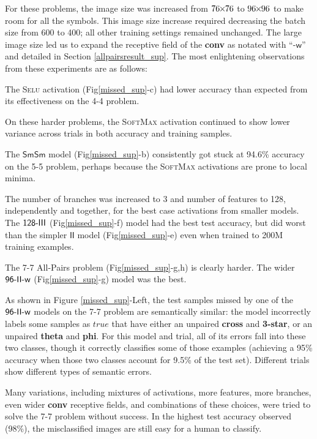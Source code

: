 For these problems, the image size was increased
from $76{\mkern-1.5mu\times\mkern-1.5mu}76$ to $96{\mkern-1.5mu\times\mkern-1.5mu}96$ to make room for all the symbols.
This image size increase required decreasing the batch size from 600 to
400; all other training settings remained unchanged.  The large image size led us to expand the receptive field of the \textbf{conv} as notated with ``-$\mathsf{w}$'' and detailed in Section \ref{allpairsresult_sup}.  The most enlightening observations from these experiments are as follows:
\vspace{-4mm}
\begin{tightitemize}
\item The \textsc{Selu} activation (Fig\ref{missed_sup}-c) had lower accuracy
than expected from its effectiveness on the 4-4 problem.
\item On these harder problems, the \textsc{SoftMax} activation continued to
show lower variance across trials in both accuracy and training samples.
\item The $\mathsf{SmSm}$ model (Fig\ref{missed_sup}-b) consistently got stuck
at 94.6\% accuracy on the 5-5 problem, perhaps because the \textsc{SoftMax} activations are prone
to local minima.
\item The number of branches was increased to 3 and number of features to 128,
  independently and together, for the best case activations from smaller models.
  The $\mathsf{128{\text -}III}$ (Fig\ref{missed_sup}-f) model had the best test accuracy, but did worst than the simpler $\mathsf{II}$ model
  (Fig\ref{missed_sup}-e) even when trained to 200M training examples.
\item The 7-7 All-Pairs problem (Fig\ref{missed_sup}-g,h) is clearly
harder. The wider $\mathsf{96{\text -}II{\text -}w}$ (Fig\ref{missed_sup}-g) model was the best.
\item As shown in Figure \ref{missed_sup}-Left, the test samples missed by
one of the $\mathsf{96{\text -}II{\text -}w}$ models on the 7-7 problem are semantically similar: the
model incorrectly labels some samples as $true$ that have either an unpaired
\textbf{cross} and \textbf{3-star}, or an unpaired \textbf{theta} and \textbf{phi}.  For this model and trial, all of its errors fall into these two classes, though it correctly classifies some of those examples (achieving a 95\% accuracy when those two classes account for 9.5\% of the test set).  Different trials show different types of semantic errors.
\item Many variations, including mixtures of activations, more features, more branches, even wider \textbf{conv} receptive fields, and combinations of these choices, were tried to solve the 7-7 problem without success.  In the highest test accuracy observed (98\%), the misclassified images are still easy for a human to classify.
\end{tightitemize}

